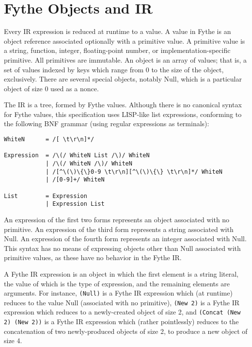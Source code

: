 \chapter{Fythe Objects and IR}

Every IR expression is reduced at runtime to a value. A value in Fythe is an
object reference associated optionally with a primitive value. A primitive
value is a string, function, integer, floating-point number, or
implementation-specific primitive. All primitives are immutable. An object is
an array of values; that is, a set of values indexed by keys which range from 0
to the size of the object, exclusively. There are several special objects,
notably Null, which is a particular object of size 0 used as a nonce.

The IR is a tree, formed by Fythe values. Although there is no canonical syntax
for Fythe values, this specification uses LISP-like list expressions,
conforming to the following BNF grammar (using regular expressions as
terminals):

\begin{verbatim}
WhiteN      = /[ \t\r\n]*/

Expression  = /\(/ WhiteN List /\)/ WhiteN
            | /\(/ WhiteN /\)/ WhiteN
            | /[^\(\)\{\}0-9 \t\r\n][^\(\)\{\} \t\r\n]*/ WhiteN
            | /[0-9]+/ WhiteN

List        = Expression
            | Expression List
\end{verbatim}

An expression of the first two forms represents an object associated with no
primitive. An expression of the third form represents a string associated with
Null. An expression of the fourth form represents an integer associated with
Null. This syntax has no means of expressing objects other than Null associated
with primitive values, as these have no behavior in the Fythe IR.

A Fythe IR expression is an object in which the first element is a string
literal, the value of which is the type of expression, and the remaining
elements are arguments. For instance,
\texttt{(Null)}
is a Fythe IR expression which (at runtime) reduces to the value Null
(associated with no primitive),
\texttt{(New 2)}
is a Fythe IR expression which reduces to a newly-created object of size 2, and
\texttt{(Concat (New 2) (New 2))}
is a Fythe IR expression which (rather pointlessly) reduces to the
concatenation of two newly-produced objects of size 2, to produce a new object
of size 4.

